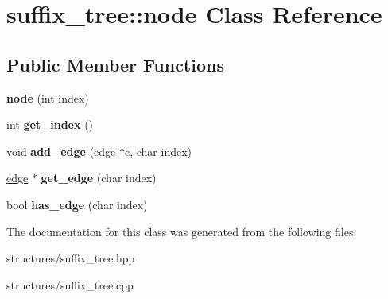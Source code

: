 \hypertarget{classsuffix__tree_1_1node}{\section{suffix\+\_\+tree\+:\+:node Class Reference}
\label{classsuffix__tree_1_1node}
}
\subsection*{Public Member Functions}
\begin{DoxyCompactItemize}
\item 
\hypertarget{classsuffix__tree_1_1node_a7a6ccca904c47d555e55e4aba1ebd99c}{{\bfseries node} (int index)}\label{classsuffix__tree_1_1node_a7a6ccca904c47d555e55e4aba1ebd99c}

\item 
\hypertarget{classsuffix__tree_1_1node_abb452bc081d5f178819e5987c3fb6bbc}{int {\bfseries get\+\_\+index} ()}\label{classsuffix__tree_1_1node_abb452bc081d5f178819e5987c3fb6bbc}

\item 
\hypertarget{classsuffix__tree_1_1node_ad0d7685baec672218057823831903b78}{void {\bfseries add\+\_\+edge} (\hyperlink{classsuffix__tree_1_1edge}{edge} $\ast$e, char index)}\label{classsuffix__tree_1_1node_ad0d7685baec672218057823831903b78}

\item 
\hypertarget{classsuffix__tree_1_1node_ac0a751778ca1452fbb03c22624d27169}{\hyperlink{classsuffix__tree_1_1edge}{edge} $\ast$ {\bfseries get\+\_\+edge} (char index)}\label{classsuffix__tree_1_1node_ac0a751778ca1452fbb03c22624d27169}

\item 
\hypertarget{classsuffix__tree_1_1node_a9f5e36d0541512b1f3de7c5de889bfe1}{bool {\bfseries has\+\_\+edge} (char index)}\label{classsuffix__tree_1_1node_a9f5e36d0541512b1f3de7c5de889bfe1}

\end{DoxyCompactItemize}


The documentation for this class was generated from the following files\+:\begin{DoxyCompactItemize}
\item 
structures/suffix\+\_\+tree.\+hpp\item 
structures/suffix\+\_\+tree.\+cpp\end{DoxyCompactItemize}
